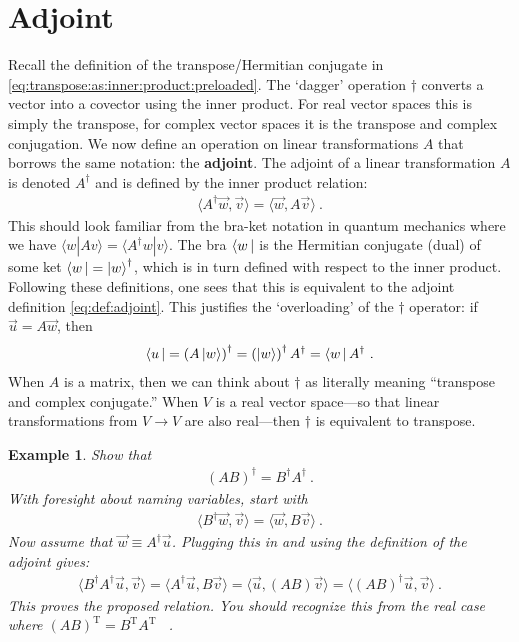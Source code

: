 \documentclass[
  11pt,
	colorful,
	raggedright,
]{tufte-style-thesis-flip}
\newtheorem{example}{Example}[section]
\begin{document}
\section{Adjoint}

Recall the definition of the transpose/Hermitian conjugate in \eqref{eq:transpose:as:inner:product:preloaded}. The `dagger' operation $\dag$ converts a vector into a covector using the inner product. For real vector spaces this is simply the transpose, for complex vector spaces it is the transpose and complex conjugation. We now define an operation on linear transformations $A$ that borrows the same notation: the \textbf{adjoint}. The adjoint of a linear transformation $A$ is denoted $A^\dag$ and is defined by the inner product relation:
\begin{align}
  \langle A^\dag \vec{w}, \vec{v} \rangle = \langle \vec{w}, A\vec{v}\rangle \ .
  \label{eq:def:adjoint}
\end{align}
This should look familiar from the bra-ket notation in quantum mechanics where we have $\langle w|A v\rangle = \langle A^\dag w|v\rangle$. The bra $\left\langle w\,\right|$ is the Hermitian conjugate (dual) of some ket $\left\langle w\,\right| = \left|w\right\rangle^\dag$, which is in turn defined with respect to the inner product. Following these definitions, one sees that this is equivalent to the adjoint definition \eqref{eq:def:adjoint}. This justifies the `overloading' of the $\dag$ operator: if $\vec{u} = A\vec{w}$, then
\begin{align}
  \left\langle u\,\right| = \left(A \left|w\right\rangle\right)^\dag = \left(\left|w\right\rangle\right)^\dag A^\dag = \left\langle w\,\right| A^\dag \ .
\end{align}
When $A$ is a matrix, then we can think about $\dag$ as literally meaning ``transpose and complex conjugate.'' When $V$ is a real vector space---so that linear transformations from $V\to V$ are also real---then $\dag$ is equivalent to transpose. 
\begin{example}
Show that 
\begin{align}
  \left(AB\right)^\dag = B^\dag A^\dag \ .
\end{align}
With foresight about naming variables, start with
\begin{align}
  \langle B^\dag \vec{w}, \vec{v}\rangle = \langle \vec{w}, B \vec{v} \rangle \ .
\end{align}
Now assume that $\vec{w} \equiv A^\dag \vec{u}$. Plugging this in and using the definition of the adjoint gives:
\begin{align}
  \langle B^\dag A^\dag \vec{u}, \vec{v}\rangle 
  = \langle A^\dag \vec{u}, B \vec{v} \rangle 
  = \langle \vec{u},  (AB) \vec{v} \rangle 
  = \langle (AB)^\dag \vec{u},   \vec{v} \rangle 
  \ .
\end{align}
This proves the proposed relation. You should recognize this from the real case where $(AB)^\text{T} = B^\text{T}A^\text{T}$ \ .
\end{example}
\end{document}
